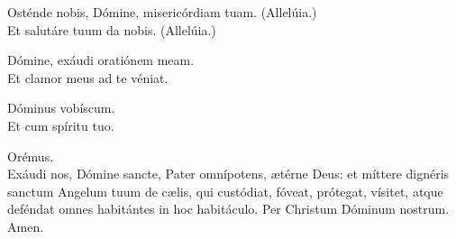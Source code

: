 \begin{minipage}{0.7\linewidth}
	\setlength{\parskip}{0.5em}
	\V Osténde nobis, Dómine, misericórdiam tuam. (Allelúia.)\\
	\R Et salutáre tuum da nobis. (Allelúia.)

	\V Dómine, exáudi oratiónem meam.\\
	\R Et clamor meus ad te véniat.

	\V Dóminus vobíscum.\\
	\R Et cum spíritu tuo.

	Orémus.\\
	Exáudi nos, Dómine sancte, Pater omnípotens, \ae{}térne Deus:
	et míttere dignéris sanctum Angelum tuum de c\ae{}lis, qui custódiat,
	fóveat, prótegat, vísitet, atque deféndat omnes habitántes in hoc habitáculo.
	Per Christum Dóminum nostrum.\\
	\R Amen.
\end{minipage}
%
\begin{minipage}{0.05\linewidth}~\end{minipage}
%
\begin{minipage}{0.25\linewidth}
	\setlength{\parskip}{0.7em}

	\scriptsize{}
\end{minipage}
